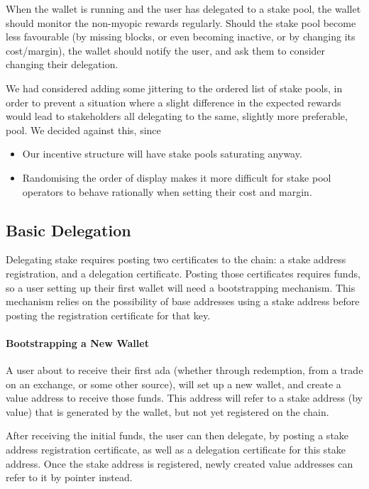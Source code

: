 \documentclass[11pt,a4paper,dvipsnames,twosided]{article}
\begin{document}
When the wallet is running and the user has delegated to a stake pool, the
wallet should monitor the non-myopic rewards regularly. Should the stake pool
become less favourable (by missing blocks, or even becoming inactive, or by
changing its cost/margin), the wallet should notify the user, and ask them to
consider changing their delegation.

We had considered adding some jittering to the ordered list of stake pools, in
order to prevent a situation where a slight difference in the expected rewards would
lead to stakeholders all delegating to the same, slightly more preferable, pool.
We decided against this, since
\begin{itemize}
\item Our incentive structure will have stake pools saturating anyway.
\item Randomising the order of display makes it more difficult for stake pool
  operators to behave rationally when setting their cost and margin.
\end{itemize}

\subsection{Basic Delegation}
\label{basic-delegation}

Delegating stake requires posting two certificates to the chain: a
stake address registration, and a delegation certificate. Posting those
certificates requires funds, so a user setting up their first wallet
will need a bootstrapping mechanism. This mechanism relies on the
possibility of base addresses using a stake address before posting the
registration certificate for that key.

\paragraph{Bootstrapping a New Wallet}
A user about to receive their first ada (whether through redemption,
from a trade on an exchange, or some other source), will set up a new
wallet, and create a value address to receive those funds. This address
will refer to a stake address (by value) that is generated by the
wallet, but not yet registered on the chain.

After receiving the initial funds, the user can then delegate, by posting a
stake address registration certificate, as well as a delegation certificate for
this stake address. Once the stake address is registered, newly created
value addresses can refer to it by pointer instead.
\end{document}
